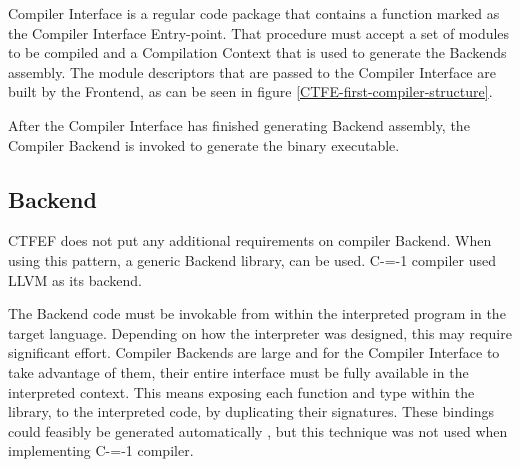 Compiler Interface is a regular code package that contains a function marked as the Compiler Interface Entry-point.
That procedure must accept a set of modules to be compiled and a Compilation Context that is used to generate the Backends assembly.
The module descriptors that are passed to the Compiler Interface are built by the Frontend, as can be seen in figure \ref{CTFE-first-compiler-structure}.

After the Compiler Interface has finished generating Backend assembly, the Compiler Backend is invoked to generate the binary executable.
\subsection{Backend}
\label{Backend}

CTFEF does not put any additional requirements on compiler Backend.
When using this pattern, a generic Backend library, can be used.
C-=-1 compiler used LLVM\cite{lattner2008llvm} as its backend.

The Backend code must be invokable from within the interpreted program in the target language.
Depending on how the interpreter was designed, this may require significant effort. %
Compiler Backends are large and for the Compiler Interface to take advantage of them, their entire interface must be fully available in the interpreted context.
This means exposing each function and type within the library, to the interpreted code, by duplicating their signatures.
These bindings could feasibly be generated automatically \cite{marshalling_auto_generation}, but this technique was not used when implementing C-=-1 compiler.
